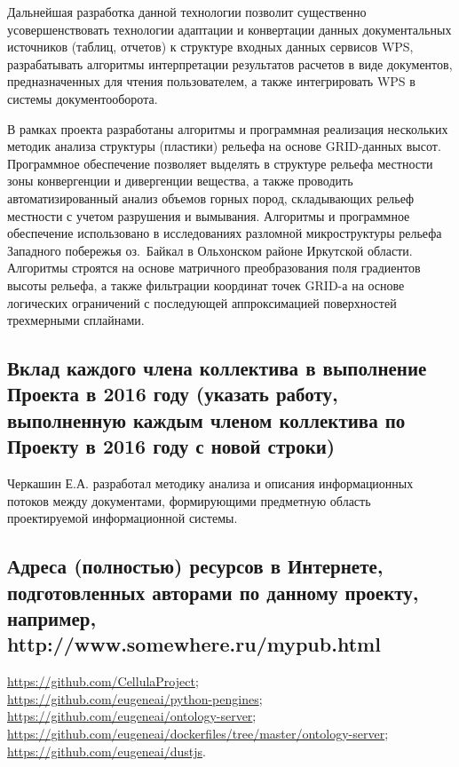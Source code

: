 \documentclass[12pt,a4paper]{ltxdoc}
\begin{document}
Дальнейшая разработка данной технологии позволит существенно усовершенствовать технологии адаптации и конвертации данных документальных источников (таблиц, отчетов) к структуре входных данных сервисов WPS, разрабатывать алгоритмы интерпретации результатов расчетов в виде документов, предназначенных для чтения пользователем, а также интегрировать WPS в системы документооборота.

В рамках проекта разработаны алгоритмы и программная реализация нескольких методик анализа структуры (пластики) рельефа на основе GRID-данных высот. Программное обеспечение позволяет выделять в структуре рельефа местности зоны конвергенции и дивергенции вещества, а также проводить автоматизированный анализ объемов горных пород, складывающих рельеф местности с учетом разрушения и вымывания.  Алгоритмы и программное обеспечение использовано в исследованиях разломной микроструктуры рельефа Западного побережья оз.~Байкал в Ольхонском районе Иркутской области. Алгоритмы строятся на основе матричного преобразования поля градиентов высоты рельефа, а также фильтрации координат точек GRID-а на основе логических ограничений с последующей аппроксимацией поверхностей трехмерными сплайнами.

\subsection{Вклад каждого члена коллектива в выполнение Проекта в 2016 году
  (указать работу, выполненную каждым членом коллектива по Проекту в 2016 году с
  новой строки)}

Черкашин Е.А. разработал методику анализа и описания информационных потоков между документами, формирующими предметную область проектируемой информационной системы.


\subsection{Адреса (полностью) ресурсов в Интернете, подготовленных авторами по
  данному проекту, например, http://www.somewhere.ru/mypub.html}

\url{https://github.com/CellulaProject};\\
\url{https://github.com/eugeneai/python-pengines};\\
\url{https://github.com/eugeneai/ontology-server};\\
\url{https://github.com/eugeneai/dockerfiles/tree/master/ontology-server};\\
\url{https://github.com/eugeneai/dustjs}.
\end{document}
